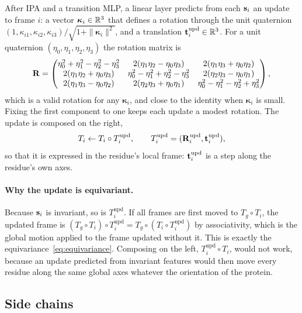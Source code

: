 After IPA and a transition MLP, a linear layer predicts from each $\mathbf{s}_i$ an update to frame $i$: a vector $\boldsymbol{\kappa}_i\in\mathbb{R}^3$ that defines a rotation through the unit quaternion $(1,\kappa_{i1},\kappa_{i2},\kappa_{i3})/\sqrt{1+\|\boldsymbol{\kappa}_i\|^2}$, and a translation $\mathbf{t}^{\text{upd}}_i\in\mathbb{R}^3$. For a unit quaternion $(\eta_0,\eta_1,\eta_2,\eta_3)$ the rotation matrix is
\begin{equation}
  \mathbf{R} = \begin{pmatrix}
    \eta_0^2+\eta_1^2-\eta_2^2-\eta_3^2 & 2(\eta_1\eta_2-\eta_0\eta_3) & 2(\eta_1\eta_3+\eta_0\eta_2)\\
    2(\eta_1\eta_2+\eta_0\eta_3) & \eta_0^2-\eta_1^2+\eta_2^2-\eta_3^2 & 2(\eta_2\eta_3-\eta_0\eta_1)\\
    2(\eta_1\eta_3-\eta_0\eta_2) & 2(\eta_2\eta_3+\eta_0\eta_1) & \eta_0^2-\eta_1^2-\eta_2^2+\eta_3^2
  \end{pmatrix},
\end{equation}
which is a valid rotation for any $\boldsymbol{\kappa}_i$, and close to the identity when $\boldsymbol{\kappa}_i$ is small. Fixing the first component to one keeps each update a modest rotation. The update is composed on the right,
\begin{equation}
  T_i \leftarrow T_i\circ T^{\text{upd}}_i, \qquad T^{\text{upd}}_i=(\mathbf{R}^{\text{upd}}_i,\mathbf{t}^{\text{upd}}_i),
  \label{eq:frame_update}
\end{equation}
so that it is expressed in the residue's local frame: $\mathbf{t}^{\text{upd}}_i$ is a step along the residue's own axes.

\paragraph{Why the update is equivariant.} Because $\mathbf{s}_i$ is invariant, so is $T^{\text{upd}}_i$. If all frames are first moved to $T_g\circ T_i$, the updated frame is $(T_g\circ T_i)\circ T^{\text{upd}}_i = T_g\circ(T_i\circ T^{\text{upd}}_i)$ by associativity, which is the global motion applied to the frame updated without it. This is exactly the equivariance~\eqref{eq:equivariance}. Composing on the left, $T^{\text{upd}}_i\circ T_i$, would not work, because an update predicted from invariant features would then move every residue along the same global axes whatever the orientation of the protein.

\subsection{Side chains}

